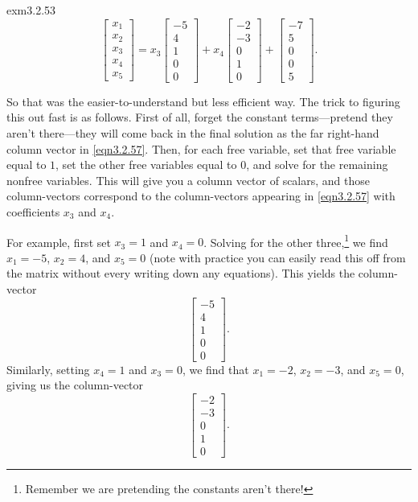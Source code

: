 \begin{exm}{}{exm3.2.53}
\begin{equation}
		\begin{bmatrix}x_1 \\ x_2 \\ x_3 \\ x_4 \\ x_5\end{bmatrix}=x_3\begin{bmatrix}-5 \\ 4 \\ 1 \\ 0 \\ 0\end{bmatrix}+x_4\begin{bmatrix}-2 \\ -3 \\ 0 \\ 1 \\ 0\end{bmatrix}+\begin{bmatrix}-7 \\ 5 \\ 0 \\ 0 \\ 5\end{bmatrix}.
	\end{equation}
	
	So that was the easier-to-understand but less efficient way.  The trick to figuring this out fast is as follows.  First of all, forget the constant terms---pretend they aren't there---they will come back in the final solution as the far right-hand column vector in \eqref{eqn3.2.57}.  Then, for each free variable, set that free variable equal to $1$, set the other free variables equal to $0$, and solve for the remaining nonfree variables.  This will give you a column vector of scalars, and those column-vectors correspond to the column-vectors appearing in \eqref{eqn3.2.57} with coefficients $x_3$ and $x_4$.
	
	For example, first set $x_3=1$ and $x_4=0$.  Solving for the other three,\footnote{Remember we are pretending the constants aren't there!} we find $x_1=-5$, $x_2=4$, and $x_5=0$ (note with practice you can easily read this off from the matrix without every writing down any equations).  This yields the column-vector
	\begin{equation}
		\begin{bmatrix}-5 \\ 4 \\ 1 \\ 0 \\ 0\end{bmatrix}.
	\end{equation}
	Similarly, setting $x_4=1$ and $x_3=0$, we find that $x_1=-2$, $x_2=-3$, and $x_5=0$, giving us the column-vector
	\begin{equation}
		\begin{bmatrix}-2 \\ -3 \\ 0 \\ 1 \\ 0\end{bmatrix}.
	\end{equation}
	

\end{exm}
